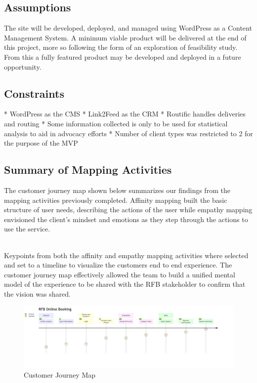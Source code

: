 \documentclass[english,course]{lecture}
\begin{document}
\subsection{Assumptions}
The site will be developed, deployed, and managed using WordPress as a Content Management System. A minimum viable product will be delivered at the end of this project, more so following the form of an exploration of feasibility study. From this a fully featured product may be developed and deployed in a future opportunity.

\subsection{Constraints}
* WordPress as the CMS
* Link2Feed as the CRM
* Routific handles deliveries and routing
* Some information collected is only to be used for statistical analysis to aid in advocacy efforts
* Number of client types was restricted to 2 for the purpose of the MVP

\subsection{Summary of Mapping Activities}
The customer journey map shown below summarizes our findings from the mapping activities previously completed. Affinity mapping built the basic structure of user needs, describing the actions of the user while empathy mapping envisioned the client's mindset and emotions as they step through the actions to use the service.

\\Keypoints from both the affinity and empathy mapping activities where selected and set to a timeline to visualize the customers end to end experience. The customer journey map effectively allowed  the team to build a unified mental model of the experience to be shared with the RFB stakeholder to confirm that the vision was shared.

\begin{figure}[H]
  \centering
  \includegraphics[scale = 0.2]{cjm.jpeg}
  \caption{Customer Journey Map}
  \label{Customer Journey Map}
\end{figure}
\end{document}
